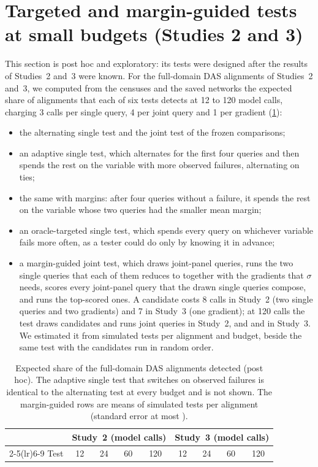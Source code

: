 \section{Targeted and margin-guided tests at small budgets (Studies 2 and 3)}\label{sec:strategies}

This section is post hoc and exploratory: its tests were designed after the results of Studies~2 and~3 were known.
For the full-domain DAS alignments of Studies~2 and~3, we computed from the censuses and the saved networks the expected
share of alignments that each of six tests detects at 12 to 120 model calls, charging 3 calls per single query, 4 per
joint query and 1 per gradient (\cref{tab:strategies}):
\begin{itemize}
  \item the alternating single test and the joint test of the frozen comparisons;
  \item an adaptive single test, which alternates for the first four queries and then spends the rest on the variable
  with more observed failures, alternating on ties;
  \item the same with margins: after four queries without a failure, it spends the rest on the variable whose two
  queries had the smaller mean margin;
  \item an oracle-targeted single test, which spends every query on whichever variable fails more often, as a tester
  could do only by knowing it in advance;
  \item a margin-guided joint test, which draws joint-panel queries, runs the two single queries that each of them
  reduces to together with the gradients that $\sigma$ needs, scores every joint-panel query that the drawn single
  queries compose, and runs the top-scored ones. A candidate costs 8 calls in Study~2 (two single queries and two
  gradients) and 7 in Study~3 (one gradient); at 120 calls the test draws \StTwoGuidedCandidates{} candidates and runs
  \StTwoGuidedRuns{} joint queries in Study~2, and \StThreeGuidedCandidates{} and \StThreeGuidedRuns{} in Study~3. We
  estimated it from \StReplicates{} simulated tests per alignment and budget, beside the same test with the
  candidates run in random order.
\end{itemize}

\begin{table}[t]
\centering
\small
\setlength{\tabcolsep}{5pt}
\begin{tabular}{@{}l c c c c c c c c@{}}
\toprule
& \multicolumn{4}{c}{Study~2 (model calls)} & \multicolumn{4}{c}{Study~3 (model calls)} \\
\cmidrule(lr){2-5}\cmidrule(lr){6-9}
Test & 12 & 24 & 60 & 120 & 12 & 24 & 60 & 120 \\
\midrule

\end{tabular}
\caption{Expected share of the full-domain DAS alignments detected (post hoc). The adaptive single test that switches
on observed failures is identical to the alternating test at every budget and is not shown. The margin-guided rows
are means of \StReplicates{} simulated tests per alignment (standard error at most \StMaxSe).}
\label{tab:strategies}
\end{table}

